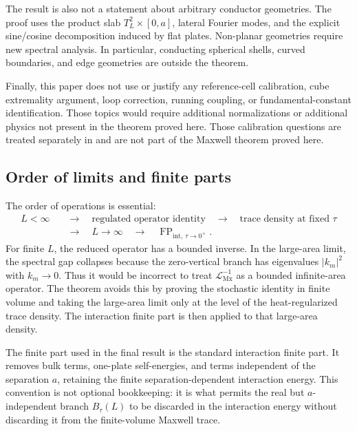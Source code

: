 \documentclass[11pt]{article}
\providecommand{\FP}{\operatorname{FP}}
\providecommand{\abs}[1]{\left\lvert #1\right\rvert}
\providecommand{\TtwoL}{T_L^2}
\providecommand{\LMx}{\mathcal L_{\mathrm{Mx}}}
\providecommand{\Btau}{B_{\tau}}
\numberwithin{equation}{section}
\begin{document}
The result is also not a statement about arbitrary conductor geometries.  The
proof uses the product slab \(\TtwoL\times[0,a]\), lateral Fourier modes, and
the explicit sine/cosine decomposition induced by flat plates.  Non-planar
geometries require new spectral analysis.  In particular, conducting spherical
shells, curved boundaries, and edge geometries are outside the theorem.

Finally, this paper does not use or justify any reference-cell calibration,
cube extremality argument, loop correction, running coupling, or
fundamental-constant identification.  Those topics would require additional
normalizations or additional physics not present in the theorem proved here.
Those calibration questions are treated separately in
\cite{KhanKhan2026Scalar} and are not part of the Maxwell theorem proved here.

\subsection{Order of limits and finite parts}
\label{subsec:order-of-limits-discussion}

The order of operations is essential:
\[
\begin{aligned}
    L<\infty
    &\quad\longrightarrow\quad
    \text{regulated operator identity}
    \quad\longrightarrow\quad
    \text{trace density at fixed }\tau \\
    &\quad\longrightarrow\quad
    L\to\infty
    \quad\longrightarrow\quad
    \FP_{\mathrm{int},\,\tau\to0^+}.
\end{aligned}
\]
For finite \(L\), the reduced operator has a bounded inverse.  In the
large-area limit, the spectral gap collapses because the zero-vertical branch
has eigenvalues \(\abs{k_m}^2\) with \(k_m\to0\).  Thus it would be incorrect
to treat \(\LMx^{-1}\) as a bounded infinite-area operator.  The theorem avoids
this by proving the stochastic identity in finite volume and taking the
large-area limit only at the level of the heat-regularized trace density.  The
interaction finite part is then applied to that large-area density.

The finite part used in the final result is the standard interaction finite
part.  It removes bulk terms, one-plate self-energies, and terms independent of
the separation \(a\), retaining the finite separation-dependent interaction
energy.  This convention is not optional bookkeeping: it is what permits the
real but \(a\)-independent branch \(\Btau(L)\) to be discarded in the
interaction energy without discarding it from the finite-volume Maxwell trace.
\end{document}
